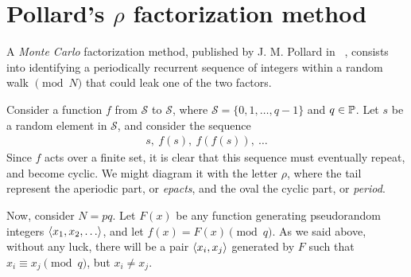 \chapter{Pollard's $\rho$ factorization method \label{chap:pollardrho}}

A \emph{Monte Carlo} factorization method, published by J. M. Pollard in
~\cite{pollardMC}, consists into identifying a periodically recurrent  sequence
of integers within a random walk $\pmod{N}$ that could leak one of the two
factors.

Consider a function $f$ from $\mathcal{S}$ to $\mathcal{S}$, where
$\mathcal{S} = \{0, 1, \ldots, q-1\}$ and $q \in \mathbb{P}$.
Let $s$ be a random element in $\mathcal{S}$, and consider the sequence
\begin{align*}
  s,\ f(s),\ f(f(s)),\ \ldots
\end{align*}
Since $f$ acts over a finite set, it is clear that this sequence must
eventually repeat, and become cyclic.
We might diagram it with the letter $\rho$, where the tail represent the
aperiodic part, or \emph{epacts}, and the oval the cyclic part, or
\emph{period}.
\begin{center}
\end{center}

Now, consider $N=pq$.
Let $F(x)$ be any function generating pseudorandom integers
$\langle x_1, x_2, \ldots\rangle$, and let $f(x) = F(x) \pmod{q}$.
As we said above, without any luck, there will be a pair $\langle x_i, x_j\rangle$
generated by $F$ such that $x_i \equiv x_j \pmod{q}$, but $x_i \neq x_j$.

